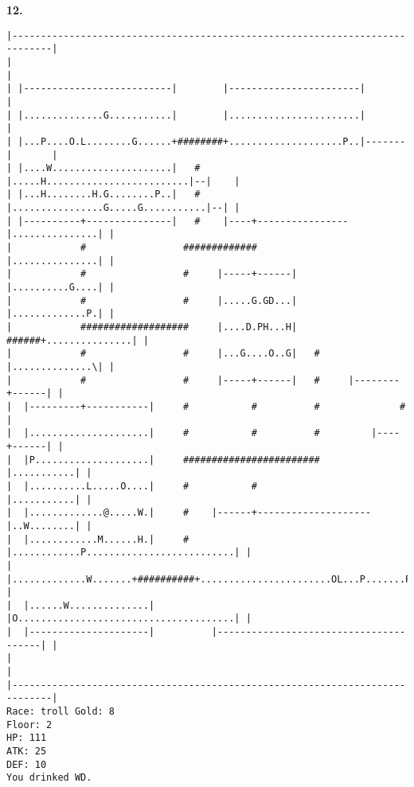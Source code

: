 \documentclass[11pt]{article}
\theoremstyle{plain}
\begin{document}
\newpage
\textbf{12. }
\begin{Verbatim}[fontsize=\scriptsize]
|-----------------------------------------------------------------------------|
|                                                                             |
| |--------------------------|        |-----------------------|               |
| |..............G...........|        |.......................|               |
| |...P....O.L........G......+########+....................P..|-------|       |
| |....W.....................|   #    |.....H.........................|--|    |
| |...H........H.G........P..|   #    |................G.....G...........|--| |
| |----------+---------------|   #    |----+----------------|...............| |
|            #                 #############                |...............| |
|            #                 #     |-----+------|         |..........G....| |
|            #                 #     |.....G.GD...|         |.............P.| |
|            ###################     |....D.PH...H|   ######+...............| |
|            #                 #     |...G....O..G|   #     |..............\| |
|            #                 #     |-----+------|   #     |--------+------| |
|  |---------+-----------|     #           #          #              #        |
|  |.....................|     #           #          #         |----+------| |
|  |P....................|     ########################         |...........| |
|  |..........L.....O....|     #           #                    |...........| |
|  |.............@.....W.|     #    |------+--------------------|..W........| |
|  |............M......H.|     #    |............P..........................| |
|  |.............W.......+##########+.......................OL...P.......P..| |
|  |......W..............|          |O......................................| |
|  |---------------------|          |---------------------------------------| |
|                                                                             |
|-----------------------------------------------------------------------------|
Race: troll Gold: 8                                                    Floor: 2
HP: 111
ATK: 25
DEF: 10
You drinked WD. 
\end{Verbatim}
\end{document}
